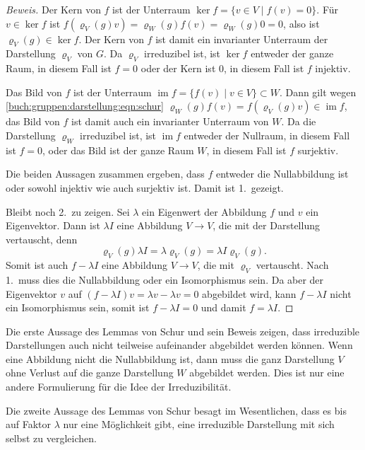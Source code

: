 \begin{proof}[Beweis]
Der Kern von $f$ ist der Unterraum
$\operatorname{ker}f = \{v\in V\mid f(v)=0\}$.
Für $v\in\operatorname{ker}f$ ist
$f(\varrho_V(g)v) = \varrho_W(g) f(v) = \varrho_W(g) 0=0$, also ist
$\varrho_V(g)\in\operatorname{ker}f$.
Der Kern von $f$ ist damit ein invarianter Unterraum der Darstellung
$\varrho_V$ von $G$.
Da $\varrho_V$ irreduzibel ist, ist $\operatorname{ker}f$ entweder
der ganze Raum, in diesem Fall ist $f=0$ oder der Kern ist $0$, in diesem
Fall ist $f$ injektiv.

Das Bild von $f$ ist der Unterraum
$\operatorname{im}f = \{f(v)\mid v\in V\}\subset W$.
Dann gilt wegen \eqref{buch:gruppen:darstellung:eqn:schur}
$\varrho_W(g)f(v) = f(\varrho_V(g)v)\in\operatorname{im}f$, das Bild von
$f$ ist damit auch ein invarianter Unterraum von $W$.
Da die Darstellung $\varrho_W$  irreduzibel ist, ist $\operatorname{im}f$
entweder der Nullraum, in diesem Fall ist $f=0$, oder das Bild ist der
ganze Raum $W$, in diesem Fall ist $f$ surjektiv.

Die beiden Aussagen zusammen ergeben, dass $f$ entweder die Nullabbildung
ist oder sowohl injektiv wie auch surjektiv ist.
Damit ist 1.~gezeigt.

Bleibt noch 2.~zu zeigen.
Sei $\lambda$ ein Eigenwert der Abbildung $f$ und $v$ ein Eigenvektor.
Dann ist $\lambda I$ eine
Abbildung $V\to V$, die mit der Darstellung vertauscht, denn
\[
\varrho_V(g)\lambda I =
\lambda \varrho_V(g) = \lambda I\varrho_V(g).
\]
Somit ist auch $f-\lambda I$ eine Abbildung $V\to V$, die mit $\varrho_V$
vertauscht.
Nach 1.~muss dies die Nullabbildung oder ein Isomorphismus sein.
Da aber der Eigenvektor $v$ auf $(f-\lambda I)v = \lambda v - \lambda v = 0$
abgebildet wird, kann $f-\lambda I$ nicht ein Isomorphismus sein, somit
ist $f-\lambda I=0$ und damit $f=\lambda I$.
\end{proof}

Die erste Aussage des Lemmas von Schur und sein Beweis zeigen, dass
irreduzible Darstellungen auch nicht teilweise aufeinander abgebildet
werden können.
Wenn eine Abbildung nicht die Nullabbildung ist, dann muss die
ganz Darstellung $V$ ohne Verlust auf die ganze Darstellung $W$
abgebildet werden.
Dies ist nur eine andere Formulierung für die Idee der Irreduzibilität.

Die zweite Aussage des Lemmas von Schur besagt im Wesentlichen, dass
es bis auf Faktor $\lambda$ nur eine Möglichkeit gibt, eine irreduzible
Darstellung mit sich selbst zu vergleichen.

